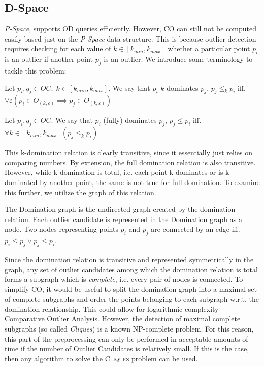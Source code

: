 \documentclass[runningheads]{llncs}
\begin{document}
\subsection{D-Space}
\emph{P-Space}, supports OD queries efficiently. However, CO can still not be computed easily based just on the \emph{P-Space} data structure. This is because outlier detection requires checking for each value of $k \in [k_{min},k_{max}]$ whether a particular point $p_i$ is an outlier if another point $p_j$ is an outlier. We introduce some terminology to tackle this problem:
\begin{definition}[K-Domination]
Let $p_i,q_j \in OC;\; k\in [k_{min},k_{max}]$. We say that $p_i$ $k$-dominates $p_j$, $p_j \leq_{k} p_i$ iff. $\forall\varepsilon(p_i \in O_{(k,\varepsilon)} \implies p_j \in O_{(k,\varepsilon)})$
\end{definition}
\begin{definition}
Let $p_i,q_j \in OC$. We say that $p_i$ (fully) dominates $p_j$, $p_j \leq p_i$ iff. $\forall k\in [k_{min},k_{max}](p_j \leq_k p_i)$
\end{definition}
This k-domination relation is clearly transitive, since it essentially just relies on comparing numbers. By extension, the full domination relation is also transitive. However, while k-domination is total, i.e. each point k-dominates or is k-dominated by another point, the same is not true for full domination. To examine this further, we utilize the graph of this relation.
\begin{definition}
The Domination graph is the undirected graph created by the domination relation. Each outlier candidate is represented in the Domination graph as a node. Two nodes representing points $p_i$ and $p_j$ are connected by an edge iff. $p_i \leq p_j \vee p_j \leq p_i$.
\end{definition}

Since the domination relation is transitive and represented symmetrically in the graph, any set of outlier candidates among which the domination relation is total forms a subgraph which is \emph{complete}, i.e. every pair of nodes is connected. To simplify CO, it would be useful to split the domination graph into a maximal set of complete subgraphs and order the points belonging to each subgraph w.r.t. the domination relationship. This could allow for logarithmic complexity Comparative Outlier Analysis. However, the detection of maximal complete subgraphs (so called \emph{Cliques}) is a known NP-complete problem. For this reason, this part of the preprocessing can only be performed in acceptable amounts of time if the number of Outlier Candidates is relatively small. If this is the case, then any algorithm to solve the \textsc{Cliques} problem can be used.
\end{document}
